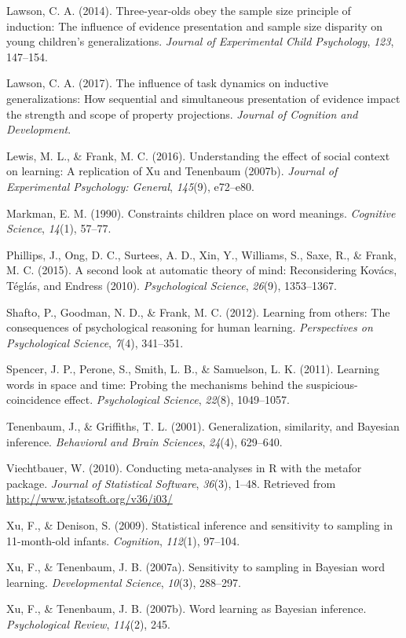 \documentclass[english,floatsintext,man]{apa6}
\theoremstyle{definition}
\theoremstyle{definition}
\theoremstyle{remark}
\begin{document}
\hypertarget{ref-lawson2014three}{}
Lawson, C. A. (2014). Three-year-olds obey the sample size principle of
induction: The influence of evidence presentation and sample size
disparity on young children's generalizations. \emph{Journal of
Experimental Child Psychology}, \emph{123}, 147--154.

\hypertarget{ref-lawson2017influence}{}
Lawson, C. A. (2017). The influence of task dynamics on inductive
generalizations: How sequential and simultaneous presentation of
evidence impact the strength and scope of property projections.
\emph{Journal of Cognition and Development}.

\hypertarget{ref-lewis2016understanding}{}
Lewis, M. L., \& Frank, M. C. (2016). Understanding the effect of social
context on learning: A replication of Xu and Tenenbaum (2007b).
\emph{Journal of Experimental Psychology: General}, \emph{145}(9),
e72--e80.

\hypertarget{ref-markman1990constraints}{}
Markman, E. M. (1990). Constraints children place on word meanings.
\emph{Cognitive Science}, \emph{14}(1), 57--77.

\hypertarget{ref-phillips2015second}{}
Phillips, J., Ong, D. C., Surtees, A. D., Xin, Y., Williams, S., Saxe,
R., \& Frank, M. C. (2015). A second look at automatic theory of mind:
Reconsidering Kovács, Téglás, and Endress (2010). \emph{Psychological
Science}, \emph{26}(9), 1353--1367.

\hypertarget{ref-shafto2012}{}
Shafto, P., Goodman, N. D., \& Frank, M. C. (2012). Learning from
others: The consequences of psychological reasoning for human learning.
\emph{Perspectives on Psychological Science}, \emph{7}(4), 341--351.

\hypertarget{ref-spencer2011learning}{}
Spencer, J. P., Perone, S., Smith, L. B., \& Samuelson, L. K. (2011).
Learning words in space and time: Probing the mechanisms behind the
suspicious-coincidence effect. \emph{Psychological Science},
\emph{22}(8), 1049--1057.

\hypertarget{ref-tenenbaum2001}{}
Tenenbaum, J., \& Griffiths, T. L. (2001). Generalization, similarity,
and Bayesian inference. \emph{Behavioral and Brain Sciences},
\emph{24}(4), 629--640.

\hypertarget{ref-R-metafor}{}
Viechtbauer, W. (2010). Conducting meta-analyses in R with the metafor
package. \emph{Journal of Statistical Software}, \emph{36}(3), 1--48.
Retrieved from \url{http://www.jstatsoft.org/v36/i03/}

\hypertarget{ref-xu2009}{}
Xu, F., \& Denison, S. (2009). Statistical inference and sensitivity to
sampling in 11-month-old infants. \emph{Cognition}, \emph{112}(1),
97--104.

\hypertarget{ref-xu2007b}{}
Xu, F., \& Tenenbaum, J. B. (2007a). Sensitivity to sampling in Bayesian
word learning. \emph{Developmental Science}, \emph{10}(3), 288--297.

\hypertarget{ref-xu2007word}{}
Xu, F., \& Tenenbaum, J. B. (2007b). Word learning as Bayesian
inference. \emph{Psychological Review}, \emph{114}(2), 245.
\end{document}
